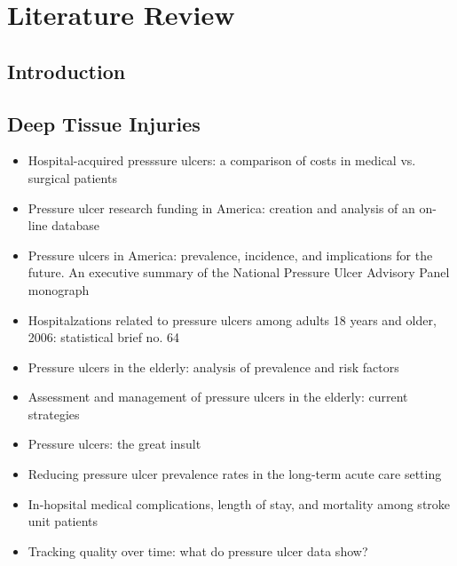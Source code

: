 \chapter{Literature Review}
	\section{Introduction}

	\section{Deep Tissue Injuries}
		\begin{itemize}
			\item Hospital-acquired presssure ulcers: a comparison of costs in medical vs. surgical patients \cite{beckrich99}
			\item Pressure ulcer research funding in America: creation and analysis of an on-line database \cite{zanca03}
			\item Pressure ulcers in America: prevalence, incidence, and implications for the future. An executive summary of the National Pressure Ulcer Advisory Panel monograph \cite{npuapexecutive}
			\item Hospitalzations related to pressure ulcers among adults 18 years and older, 2006: statistical brief no. 64 \cite{russo08}
			\item Pressure ulcers in the elderly: analysis of prevalence and risk factors \cite{freitas11}
			\item Assessment and management of pressure ulcers in the elderly: current strategies \cite{jaul10}
			\item Pressure ulcers: the great insult \cite{maklebust05}
			\item Reducing pressure ulcer prevalence rates in the long-term acute care setting \cite{milne09}
			\item In-hopsital medical complications, length of stay, and mortality among stroke unit patients \cite{ingeman11}
			\item Tracking quality over time: what do pressure ulcer data show? \cite{gunningberg08}
		\end{itemize}

